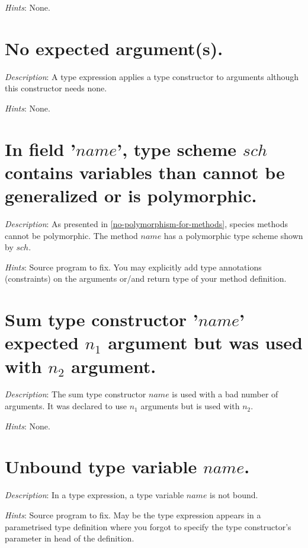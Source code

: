 {\em Hints}: None.



\section*{No expected argument(s).}
{\em Description}: A type expression applies a type constructor to
arguments although this constructor needs none.

{\em Hints}: None.



\section*{In field '$name$', type scheme $sch$ contains variables than
  cannot be generalized or is polymorphic.}

{\em Description}: As presented in \ref{no-polymorphism-for-methods},
species methods cannot be polymorphic. The method $name$ has a
polymorphic type scheme shown by $sch$.

{\em Hints}: Source program to fix. You may explicitly add type
annotations (constraints) on the arguments or/and return type of your
method definition.




\section*{Sum type constructor '$name$' expected $n_1$ argument but
  was used with $n_2$ argument.}

{\em Description}: The sum type constructor $name$ is used with a bad
number of arguments. It was declared to use $n_1$ arguments but is
used with $n_2$.

{\em Hints}: None.



\section*{Unbound type variable $name$.}

{\em Description}: In a type expression, a type variable $name$ is not
bound.

{\em Hints}: Source program to fix. May be the type expression appears
in a parametrised type definition where you forgot to specify the type
constructor's parameter in head of the definition.



